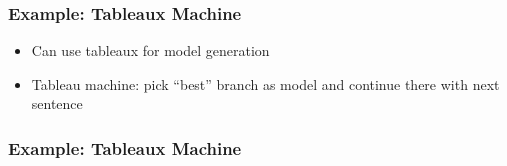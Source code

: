 \begin{frame}[fragile]
    \frametitle{Example: Tableaux Machine}
    \begin{itemize}
        \item Can use tableaux for model generation
        \item Tableau machine: pick ``best'' branch as model and continue there with next sentence
    \end{itemize}

    \vspace{1.5em}
    \begin{minipage}[t][4.5cm]{\textwidth}
        
    \end{minipage}
\end{frame}

\begin{frame}
    \frametitle{Example: Tableaux Machine}
    \makebox[\linewidth]{}
\end{frame}
